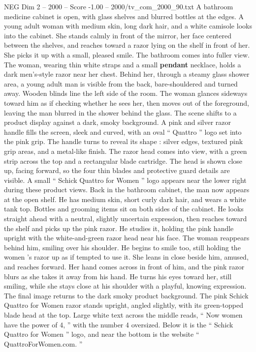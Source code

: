 \begin{textsample}{NEG Dim 2 – 2000 – Score -1.00 – 2000/tv\_com\_2000\_90.txt}  \label{ex:f2_neg_076}
A bathroom medicine cabinet is open, with glass shelves and blurred bottles at the edges.
A young adult woman with medium skin, long dark hair, and a white camisole looks into the cabinet.
She stands calmly in front of the mirror, her face centered between the shelves, and reaches toward a razor lying on the shelf in front of her.
She picks it up with a small, pleased smile.
The bathroom comes into fuller view.
The woman, wearing thin white straps and a small \textbf{pendant} necklace, holds a dark men’s-style razor near her chest.
Behind her, through a steamy glass shower area, a young adult man is visible from the back, bare-shouldered and turned away.
Wooden blinds line the left side of the room.
The woman glances sideways toward him as if checking whether he sees her, then moves out of the foreground, leaving the man blurred in the shower behind the glass.
The scene shifts to a product display against a dark, smoky background.
A pink and silver razor handle fills the screen, sleek and curved, with an oval “ Quattro ” logo set into the pink grip.
The handle turns to reveal its shape : silver edges, textured pink grip areas, and a metal-like finish.
The razor head comes into view, with a green strip across the top and a rectangular blade cartridge.
The head is shown close up, facing forward, so the four thin blades and protective guard details are visible.
A small “ Schick Quattro for Women ” logo appears near the lower right during these product views.
Back in the bathroom cabinet, the man now appears at the open shelf.
He has medium skin, short curly dark hair, and wears a white tank top.
Bottles and grooming items sit on both sides of the cabinet.
He looks straight ahead with a neutral, slightly uncertain expression, then reaches toward the shelf and picks up the pink razor.
He studies it, holding the pink handle upright with the white-and-green razor head near his face.
The woman reappears behind him, smiling over his shoulder.
He begins to smile too, still holding the women ’s razor up as if tempted to use it.
She leans in close beside him, amused, and reaches forward.
Her hand comes across in front of him, and the pink razor blurs as she takes it away from his hand.
He turns his eyes toward her, still smiling, while she stays close at his shoulder with a playful, knowing expression.
The final image returns to the dark smoky product background.
The pink Schick Quattro for Women razor stands upright, angled slightly, with its green-topped blade head at the top.
Large white text across the middle reads, “ Now women have the power of 4, ” with the number 4 oversized.
Below it is the “ Schick Quattro for Women ” logo, and near the bottom is the website “ QuattroForWomen.com. ”

\end{textsample}
